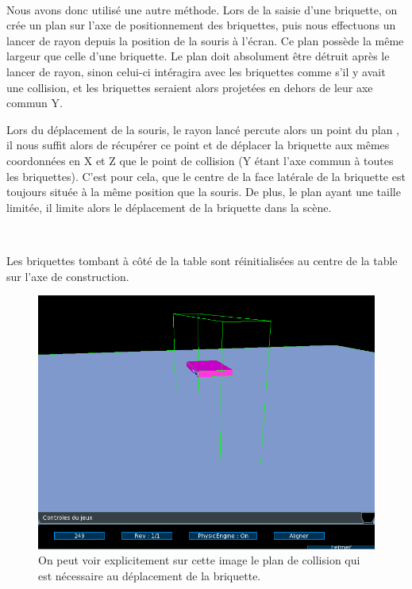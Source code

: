 \documentclass[frenchb,twoside]{EPURapport}
\begin{document}
        \
        
        Nous avons donc utilisé une autre méthode.
        Lors de la saisie d'une briquette, on crée un plan sur l'axe de positionnement
        des briquettes, puis nous effectuons un lancer de rayon depuis la position de
        la souris à l'écran. Ce plan possède la même largeur que celle d'une briquette.
        Le plan doit absolument être détruit après le lancer de rayon, sinon celui-ci intéragira avec
        les briquettes comme s'il y avait une collision, et les briquettes seraient alors projetées en dehors
        de leur axe commun Y.
        
        Lors du déplacement de la souris, le rayon lancé percute alors un point du plan
        , il nous suffit alors de récupérer ce point et de déplacer la briquette aux mêmes
        coordonnées en X et Z que le point de collision (Y étant l'axe commun à toutes les briquettes).
        C'est pour cela, que le centre de la face latérale de la briquette est toujours
		située à la même position que la souris.
		De plus, le plan ayant une taille limitée, il limite alors le déplacement de la briquette dans la scène.
        
        \
        
        Les briquettes tombant à côté de la table sont réinitialisées au centre
        de la table sur l'axe de construction.
		
		
		\begin{figure}[h]
			\centering
			\includegraphics[width=16cm]{images/move_briquette.png}
			\caption{\label{fig:move_briquette}On peut voir explicitement sur cette image le plan de collision
			qui est nécessaire au déplacement de la briquette.}
		\end{figure}
		
\end{document}
